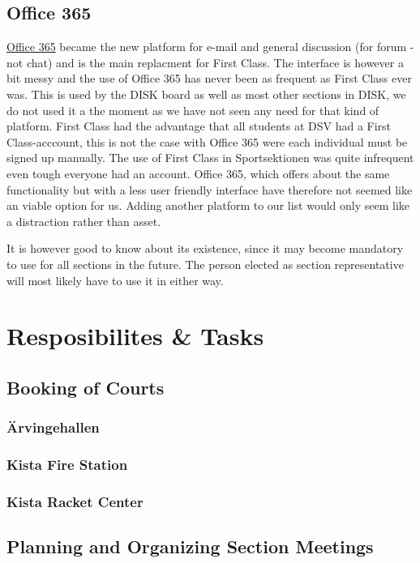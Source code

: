 \documentclass[12pt,a4paper]{article}
\begin{document}
		\subsection{Office 365}
			\href{http://portal.office.com}{Office 365} became the new platform for e-mail and general discussion (for forum - not chat) and is the main replacment for First Class. The interface is however a bit messy and the use of Office 365 has never been as frequent as First Class ever was. This is used by the DISK board as well as most other sections in DISK, we do not used it a the moment as we have not seen any need for that kind of platform. First Class had the advantage that all students at DSV had a First Class-acccount, this is not the case with Office 365 were each individual must be signed up manually. The use of First Class in Sportsektionen was quite infrequent even tough everyone had an account. Office 365, which offers about the same functionality but with a less user friendly interface have therefore not seemed like an viable option for us. Adding another platform to our list would only seem like a distraction rather than asset.

			It is however good to know about its existence, since it may become mandatory to use for all sections in the future. The person elected as section representative will most likely have to use it in either way.

	\section{Resposibilites \& Tasks}
		\subsection{Booking of Courts}
			\subsubsection{Ärvingehallen}
			\subsubsection{Kista Fire Station}
			\subsubsection{Kista Racket Center}
		\subsection{Planning and Organizing Section Meetings}
\end{document}
